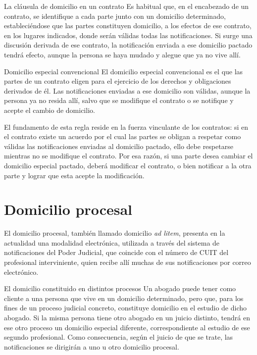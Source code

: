 \documentclass[12pt,oneside]{book}
\begin{document}
\begin{example}{La cláusula de domicilio en un contrato}
Es habitual que, en el encabezado de un contrato, se identifique a cada parte junto con un domicilio determinado, estableciéndose que las partes constituyen domicilio, a los efectos de ese contrato, en los lugares indicados, donde serán válidas todas las notificaciones. Si surge una discusión derivada de ese contrato, la notificación enviada a ese domicilio pactado tendrá efecto, aunque la persona se haya mudado y alegue que ya no vive allí.
\end{example}

\begin{definition}{Domicilio especial convencional}
El domicilio especial convencional es el que las partes de un contrato eligen para el ejercicio de los derechos y obligaciones derivados de él. Las notificaciones enviadas a ese domicilio son válidas, aunque la persona ya no resida allí, salvo que se modifique el contrato o se notifique y acepte el cambio de domicilio.
\end{definition}

\begin{important}
El fundamento de esta regla reside en la fuerza vinculante de los contratos: si en el contrato existe un acuerdo por el cual las partes se obligan a respetar como válidas las notificaciones enviadas al domicilio pactado, ello debe respetarse mientras no se modifique el contrato. Por esa razón, si una parte desea cambiar el domicilio especial pactado, deberá modificar el contrato, o bien notificar a la otra parte y lograr que esta acepte la modificación.
\end{important}

\section{Domicilio procesal}

El domicilio procesal, también llamado domicilio \textit{ad litem}, presenta en la actualidad una modalidad electrónica, utilizada a través del sistema de notificaciones del Poder Judicial, que coincide con el número de CUIT del profesional interviniente, quien recibe allí muchas de sus notificaciones por correo electrónico.

\begin{example}{El domicilio constituido en distintos procesos}
Un abogado puede tener como cliente a una persona que vive en un domicilio determinado, pero que, para los fines de un proceso judicial concreto, constituye domicilio en el estudio de dicho abogado. Si la misma persona tiene otro abogado en un juicio distinto, tendrá en ese otro proceso un domicilio especial diferente, correspondiente al estudio de ese segundo profesional. Como consecuencia, según el juicio de que se trate, las notificaciones se dirigirán a uno u otro domicilio procesal.
\end{example}
\end{document}
